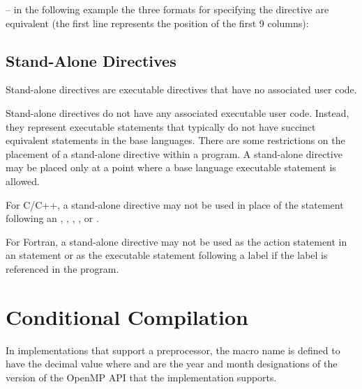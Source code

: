 \notestart
\noteheader – in the following example the three formats for specifying the directive are 
equivalent (the first line represents the position of the first 9 columns):

\begin{alltt}
\end{alltt}
\noteend
\bigskip
\fortranspecificend








\subsection{Stand-Alone Directives}
\label{subsec:Stand-Alone Directives}
\summary
Stand-alone directives are executable directives that have no associated user code.

\descr
Stand-alone directives do not have any associated executable user code. Instead, they 
represent executable statements that typically do not have succinct equivalent statements 
in the base languages. There are some restrictions on the placement of a stand-alone 
directive within a program. A stand-alone directive may be placed only at a point where 
a base language executable statement is allowed.

\restrictions
\ccppspecificstart
For C/C++, a stand-alone directive may not be used in place of the statement following 
an , , , , or . 
\ccppspecificend

\fortranspecificstart
For Fortran, a stand-alone directive may not be used as the action statement in an  
statement or as the executable statement following a label if the label is referenced in 
the program.
\fortranspecificend









\section{Conditional Compilation}
\label{sec:Conditional Compilation}
In implementations that support a preprocessor, the  macro name is defined to 
have the decimal value  where  and  are the year and month designations 
of the version of the OpenMP API that the implementation supports. 

